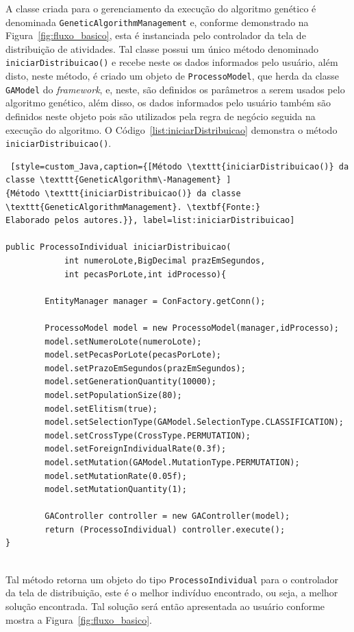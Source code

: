 \par A classe criada para o gerenciamento da execução do algoritmo genético é denominada \texttt{GeneticAlgorithmManagement} e, conforme demonstrado na Figura~\ref{fig:fluxo_basico}, esta é instanciada pelo controlador da tela de distribuição de atividades. Tal classe possui 
um único método denominado \texttt{iniciarDistribuicao()} e recebe neste os dados informados pelo usuário, além disto, neste
método, é criado um objeto de \texttt{ProcessoModel}, que herda da classe \texttt{GAModel} do \textit{framework}, e, neste, são 
definidos os parâmetros a serem usados pelo algoritmo genético, além disso, os dados informados pelo usuário também são definidos 
neste objeto pois são utilizados pela regra de negócio seguida na execução do algoritmo. O Código~\ref{list:iniciarDistribuicao} 
demonstra o método \texttt{iniciarDistribuicao()}.


\begin{lstlisting} [style=custom_Java,caption={[Método \texttt{iniciarDistribuicao()} da classe \texttt{GeneticAlgorithm\-Management} ]
{Método \texttt{iniciarDistribuicao()} da classe \texttt{GeneticAlgorithmManagement}. \textbf{Fonte:}
Elaborado pelos autores.}}, label=list:iniciarDistribuicao]

public ProcessoIndividual iniciarDistribuicao(
			int numeroLote,BigDecimal prazEmSegundos,  
			int pecasPorLote,int idProcesso){

		EntityManager manager = ConFactory.getConn(); 
		
		ProcessoModel model = new ProcessoModel(manager,idProcesso);
		model.setNumeroLote(numeroLote);
		model.setPecasPorLote(pecasPorLote);
		model.setPrazoEmSegundos(prazEmSegundos);
		model.setGenerationQuantity(10000);
		model.setPopulationSize(80);
		model.setElitism(true);
		model.setSelectionType(GAModel.SelectionType.CLASSIFICATION);
		model.setCrossType(CrossType.PERMUTATION);
		model.setForeignIndividualRate(0.3f);
		model.setMutation(GAModel.MutationType.PERMUTATION);
		model.setMutationRate(0.05f);
		model.setMutationQuantity(1);

		GAController controller = new GAController(model);
		return (ProcessoIndividual) controller.execute();
}


\end{lstlisting}

\par Tal método retorna um objeto do tipo \texttt{ProcessoIndividual} para o controlador da tela de distribuição, este é o melhor indivíduo encontrado, ou seja, a melhor solução encontrada. Tal solução será então apresentada ao usuário conforme mostra a Figura~\ref{fig:fluxo_basico}.

